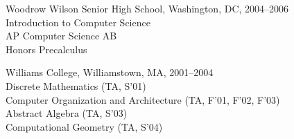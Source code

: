 \documentclass{article}
\newcommand{\cvitem}{\par\hangpara{2em}{1}}
\begin{document}
\cvitem
Woodrow Wilson Senior High School, Washington, DC, 2004--2006 \\
Introduction to Computer Science \\
AP Computer Science AB \\
Honors Precalculus

\cvitem
Williams College, Williamstown, MA, 2001--2004 \\
Discrete Mathematics (TA, S'01) \\
Computer Organization and Architecture (TA, F'01, F'02, F'03) \\
Abstract Algebra (TA, S'03) \\
Computational Geometry (TA, S'04) \\
\end{document}
